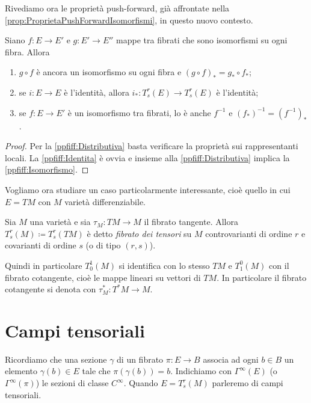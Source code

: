 Rivediamo ora le proprietà push-forward, già affrontate nella \cref{prop:ProprietaPushForwardIsomorfismi}, in questo nuovo contesto.

\begin{proposition} \label{prop:ProprietaPushForwardIsomorfismiFraFibrati}
	Siano $f:E\to E'$ e $g:E' \to E''$ mappe tra fibrati che sono isomorfismi su ogni fibra. Allora
	\begin{enumerate}
		\item $g\circ f$ è ancora un isomorfismo su ogni fibra e $(g\circ f)_* = g_* \circ f_*$; \label{ppfiff:Distributiva}
		\item se $i:E \to E$ è l'identità, allora $i_* : T_s^r(E) \to T_s^r(E)$ è l'identità; \label{ppfiff:Identita}
		\item se $f:E \to E'$ è un isomorfismo tra fibrati, lo è anche $f^{-1}$ e $(f_*)^{-1} = (f^{-1})_*$. \label{ppfiff:Isomorfismo}
	\end{enumerate}
\end{proposition}
\begin{proof}
	Per la \ref{ppfiff:Distributiva} basta verificare la proprietà sui rappresentanti locali. La \ref{ppfiff:Identita} è ovvia e insieme alla \ref{ppfiff:Distributiva} implica la \ref{ppfiff:Isomorfismo}.
\end{proof}

Vogliamo ora studiare un caso particolarmente interessante, cioè quello in cui $E = TM$ con $M$ varietà differenziabile.

\begin{definition} 
	Sia $M$ una varietà e sia $\tau_M : TM \to M$ il fibrato tangente. Allora $T_s^r(M) \coloneqq T_s^r(TM)$ è detto \emph{fibrato dei tensori} su $M$ controvarianti di ordine $r$ e covarianti di ordine $s$ (o di tipo $(r,s)$).
\end{definition}

Quindi in particolare $T_0^1(M)$ si identifica con lo stesso $TM$ e $T_1^0(M)$ con il fibrato cotangente, cioè le mappe lineari su vettori di $TM$.
In particolare il fibrato cotangente si denota con $\tau_M^* : T^*M \to M$. 

\section{Campi tensoriali}

Ricordiamo che una sezione $\gamma$ di un fibrato $\pi : E \to B$ associa ad ogni $b \in B$ un elemento $\gamma(b) \in E$ tale che $\pi(\gamma(b)) = b$.
Indichiamo con $\Gamma^\infty(E)$ (o $\Gamma^\infty(\pi)$) le sezioni di classe $C^\infty$.
Quando $E = T_s^r(M)$ parleremo di campi tensoriali.

